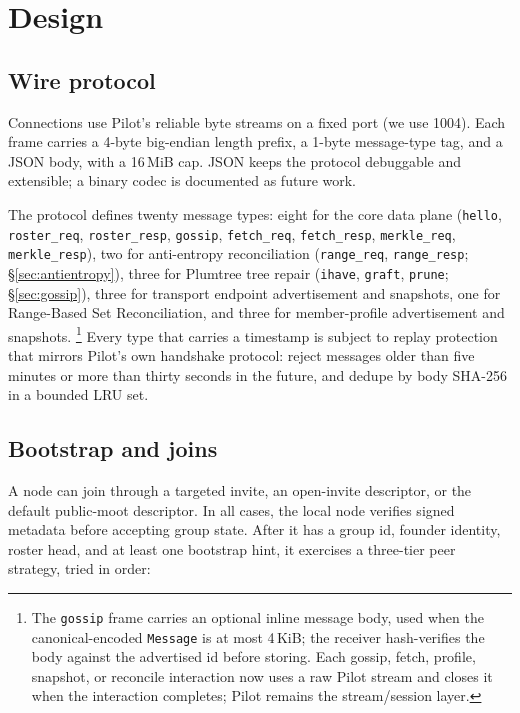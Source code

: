 \documentclass[11pt,a4paper,twocolumn]{article}
\begin{document}
\section{Design}
\label{sec:design}

\subsection{Wire protocol}

Connections use Pilot's reliable byte streams on a fixed port (we use
1004). Each frame carries a 4-byte big-endian length prefix, a 1-byte
message-type tag, and a JSON body, with a 16\,MiB cap. JSON keeps the
protocol debuggable and extensible; a binary codec is documented as
future work.

The protocol defines twenty message types: eight for the core
data plane (\texttt{hello}, \texttt{roster\_req},
\texttt{roster\_resp}, \texttt{gossip}, \texttt{fetch\_req},
\texttt{fetch\_resp}, \texttt{merkle\_req}, \texttt{merkle\_resp}),
two for anti-entropy reconciliation (\texttt{range\_req},
\texttt{range\_resp}; \S\ref{sec:antientropy}), three for
Plumtree tree repair (\texttt{ihave}, \texttt{graft},
\texttt{prune}; \S\ref{sec:gossip}), three for transport endpoint
advertisement and snapshots, one for Range-Based Set Reconciliation,
and three for member-profile advertisement and snapshots.%
\footnote{The \texttt{gossip} frame carries an optional inline
message body, used when the canonical-encoded \texttt{Message} is at
most 4\,KiB; the receiver hash-verifies the body against the
advertised id before storing. Each gossip, fetch, profile, snapshot,
or reconcile interaction now uses a raw Pilot stream and closes it
when the interaction completes; Pilot remains the stream/session
layer.}
Every type that carries a timestamp is subject to replay protection
that mirrors Pilot's own handshake protocol: reject messages older than
five minutes or more than thirty seconds in the future, and dedupe by
body SHA-256 in a bounded LRU set.

\subsection{Bootstrap and joins}

A node can join through a targeted invite, an open-invite descriptor, or the
default public-moot descriptor. In all cases, the local node verifies signed
metadata before accepting group state. After it has a group id, founder
identity, roster head, and at least one bootstrap hint, it exercises a
three-tier peer strategy, tried in order:
\end{document}
